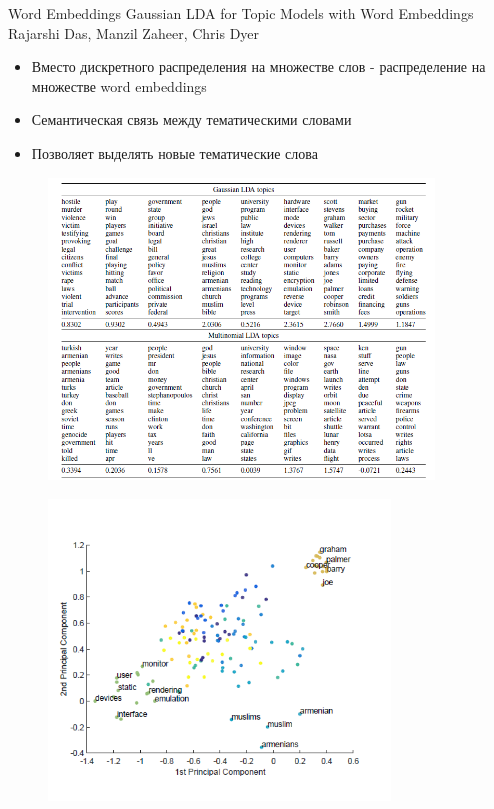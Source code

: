 \documentclass{beamer}
\begin{document}
\begin{frame}{Word Embeddings}
Gaussian LDA for Topic Models with Word Embeddings\\ Rajarshi Das, Manzil Zaheer, Chris Dyer
\begin{itemize}
\item Вместо дискретного распределения на множестве слов - распределение на множестве word embeddings
\item Семантическая связь между тематическими словами
\item Позволяет выделять новые тематические слова
\end{itemize}

\end{frame}
\begin{frame}
\begin{figure}
\includegraphics[height=8cm]{topmod2.png}
\end{figure}
\end{frame}

\begin{frame}
\begin{figure}
\includegraphics[height=8cm]{topmod3.jpg}
\end{figure}
\end{frame}
\end{document}
